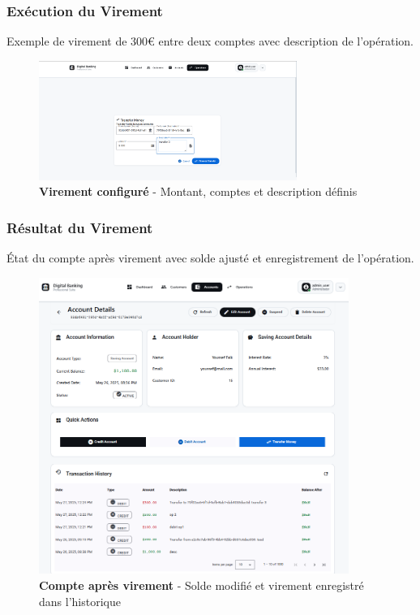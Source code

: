 \documentclass[11pt, a4paper]{article}
\begin{document}
\subsubsection{Exécution du Virement}

Exemple de virement de 300€ entre deux comptes avec description de l'opération.

\begin{figure}[H]
    \centering
    \includegraphics[width=0.75\textwidth]{screenshots/06_08_operation_transfer_form_filled.png}
    \caption{\textbf{Virement configuré} - Montant, comptes et description définis}
    \label{fig:operation_transfer_form_filled}
\end{figure}

\subsubsection{Résultat du Virement}

État du compte après virement avec solde ajusté et enregistrement de l'opération.

\begin{figure}[H]
    \centering
    \includegraphics[width=0.9\textwidth]{screenshots/06_09_account_details_after_transfer.png}
    \caption{\textbf{Compte après virement} - Solde modifié et virement enregistré dans l'historique}
    \label{fig:account_details_after_transfer}
\end{figure}
\end{document}
